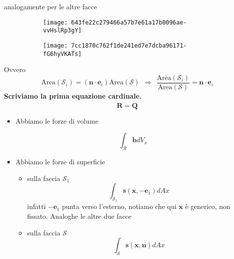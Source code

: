 \documentclass[10pt,a4paper,twoside]{book}
\begin{document}
analogamente per le altre facce

\begin{figure}[htpb]
     \centering
     \hfill
     \begin{subfigure}[b]{0.35\textwidth}
         \centering
         \texttt{[image: 643fe22c279466a57b7e61a17b0096ae-vvHslRp3gY]}
     \end{subfigure}
     \hfill
     \begin{subfigure}[b]{0.35\textwidth}
         \centering
         \texttt{[image: 7cc1870c762f1de241ed7e7dcba96171-fG6hyVKATs]}
     \end{subfigure}
     \hfill
\end{figure}
\FloatBarrier

Ovvero
\begin{equation*}
\mathrm{Area}(\mathcal{S}_{i}) =(\mathbf{n} \cdotp \mathbf{e}_{i})\mathrm{Area}(\mathcal{S}) \ \ \Rightarrow \ \ \frac{\mathrm{Area}(\mathcal{S}_{i})}{\mathrm{Area}(\mathcal{S})} =\mathbf{n} \cdotp \mathbf{e}_{i}
\end{equation*}
\textbf{Scriviamo la prima equazione cardinale.}
\begin{equation*}
\mathbf{R} =\dot{\mathbf{Q}}
\end{equation*}
\begin{itemize}
\item Abbiamo le forze di volume

\begin{equation*}
\int _{\mathcal{R}}\mathbf{b} dV_{x}
\end{equation*}
\item Abbiamo le forze di superficie
\begin{itemize}
\item sulla faccia $\mathcal{S}_{1}$\begin{equation*}
\int _{\mathcal{S}_{1}}\mathbf{s}(\mathbf{x} ,-\mathbf{e}_{1}) dAx
\end{equation*}infatti $-\mathbf{e}_{1}$ punta verso l'esterno, notiamo che qui $\mathbf{x}$ è generico, non fissato. Analoghe le altre due facce
\item sulla faccia $\mathcal{S}$\begin{equation*}
\int _{\mathcal{S}}\mathbf{s}(\mathbf{x} ,\mathbf{n}) dAx
\end{equation*}
\end{itemize}
\end{itemize}
\end{document}
